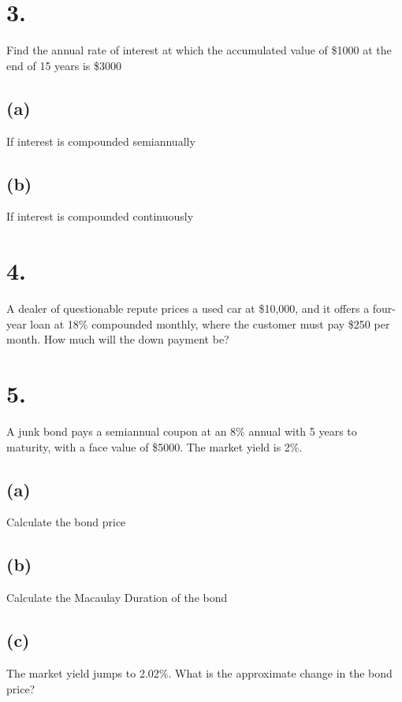 \documentclass{article}
\begin{document}
\section*{3.}
{\Large 

Find the annual rate of interest at which the accumulated value of \$1000 at the end of 15 years is \$3000

\subsection*{(a)}

If interest is compounded semiannually \\

\subsection*{(b)}

If interest is compounded continuously \\

}

\section*{4.}
{\Large 

A dealer of questionable repute prices a used car at \$10,000, and it offers a four-year loan at 18\% compounded monthly, where the customer must pay \$250 per month. How much will the down payment be?

}

\section*{5.}
{\Large 

A junk bond pays a semiannual coupon at an 8\% annual with 5 years to maturity, with a face value of \$5000. The market yield is 2\%.

\subsection*{(a)}

Calculate the bond price \\

\subsection*{(b)}

Calculate the Macaulay Duration of the bond \\

\subsection*{(c)}

The market yield jumps to 2.02\%. What is the approximate change in the bond price? \\

}
\end{document}
